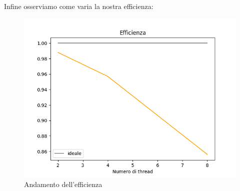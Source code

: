 \clearpage

Infine osserviamo come varia la nostra efficienza:
\begin{figure}[h!tbp]
    \centering
    \includegraphics[width=1\linewidth]{Efficienza.png}
    \caption{Andamento dell'efficienza}
    \label{fig:enter-label}
\end{figure}